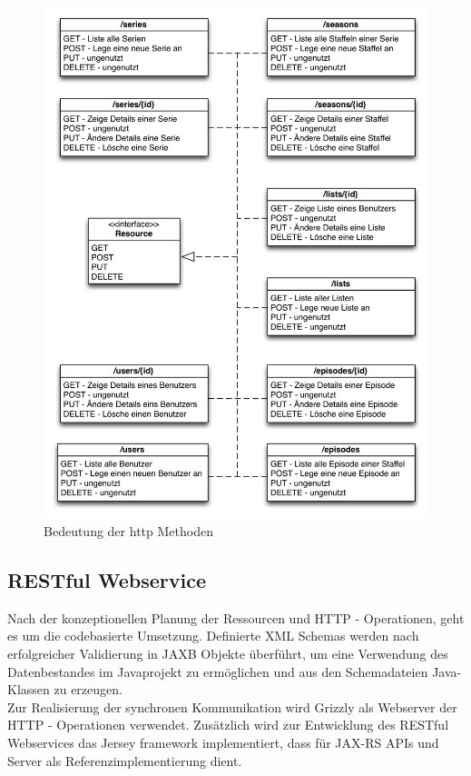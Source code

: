 \begin{figure}[H]
\includegraphics[width=1\textwidth]{../images/bedeutunghttpmethoden.png}
\caption{Bedeutung der http Methoden}
\label{bedeutunghttpmethoden}
\end{figure}

\newpage

\subsection{RESTful Webservice}

Nach der konzeptionellen Planung der Ressourcen und HTTP - Operationen, geht es um die codebasierte Umsetzung. Definierte XML Schemas werden nach erfolgreicher Validierung in JAXB Objekte überführt, um eine Verwendung des Datenbestandes im Javaprojekt zu ermöglichen und aus den Schemadateien Java-Klassen zu erzeugen.\\
Zur Realisierung der synchronen Kommunikation wird Grizzly als Webserver der HTTP - Operationen verwendet. Zusätzlich wird zur Entwicklung des RESTful Webservices das Jersey framework implementiert, dass für JAX-RS APIs und Server als Referenzimplementierung dient.


